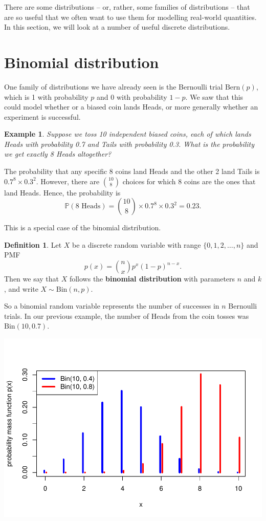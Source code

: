 \documentclass[
  a4paper,
]{book}
\theoremstyle{definition}
\newtheorem{definition}{Definition}[chapter]
\theoremstyle{definition}
\newtheorem{example}{Example}[chapter]
\theoremstyle{definition}
\theoremstyle{definition}
\theoremstyle{remark}
\begin{document}
There are some distributions -- or, rather, some families of distributions -- that are so useful that we often want to use them for modelling real-world quantities. In this section, we will look at a number of useful discrete distributions.

\hypertarget{binomial}{%
\section{Binomial distribution}\label{binomial}}

One family of distributions we have already seen is the Bernoulli trial \(\text{Bern}(p)\), which is 1 with probability \(p\) and 0 with probability \(1-p\). We saw that this could model whether or a biased coin lands Heads, or more generally whether an experiment is successful.

\begin{example}
\emph{Suppose we toss 10 independent biased coins, each of which lands Heads with probability 0.7 and Tails with probability 0.3. What is the probability we get exactly 8 Heads altogether?}

The probability that any specific 8 coins land Heads and the other 2 land Tails is \(0.7^8\times 0.3^2\). However, there are \(\binom{10}{8}\) choices for which 8 coins are the ones that land Heads. Hence, the probability is
\[ \mathbb P(\text{8 Heads}) = \binom{10}{8} \times 0.7^8 \times 0.3^2 = 0.23.\]
\end{example}

This is a special case of the binomial distribution.

\begin{definition}
Let \(X\) be a discrete random variable with range \(\{0,1,2,\dots,n\}\) and PMF
\[ p(x) = \binom{n}{x} p^x (1-p)^{n-x} . \]
Then we say that \(X\) follows the \textbf{binomial distribution} with parameters \(n\) and \(k\), and write \(X \sim \text{Bin}(n,p)\).
\end{definition}

So a binomial random variable represents the number of successes in \(n\) Bernoulli trials. In our previous example, the number of Heads from the coin tosses was \(\text{Bin}(10, 0.7)\).

\includegraphics{math1710_files/figure-latex/binom-pic-1.pdf}
\end{document}
